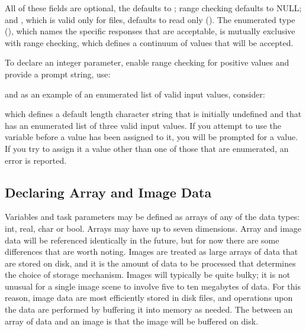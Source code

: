 \noindent
All of these fields are optional, the  defaults to
;  range checking defaults to NULL;
and , which is valid only for files, defaults to
read only ().  The enumerated type (),
which names the specific responses that are acceptable, is
mutually exclusive with range checking, which defines a continuum
of values that will be accepted.

To declare an integer parameter, enable range checking for positive
values and provide a prompt string, use:

\begin{quotation}\noindent
{} 
\end{quotation}

\noindent
and as an example of an
enumerated list of valid input values, consider:

\begin{quotation}\noindent
{} 
\end{quotation}

\noindent
which defines a default length character string that is initially undefined
and that has an enumerated list of three valid input values.
If  you  attempt to use the variable  before a value has 
been assigned to it, you will be prompted for a value.
If you try to assign it a value other than one of those that 
are enumerated, an error is reported.

\subsection{Declaring Array and Image Data}

Variables and task parameters may be defined as arrays of any of the 
data types: int, real, char or bool.  Arrays may have up to seven dimensions.
Array and image data will be referenced identically in the future, 
but for now there
are some differences that are worth noting.  Images are treated
as large arrays of data that are stored on disk, 
and it is the amount of data to be
processed that determines the choice of storage mechanism.  Images
will typically be quite bulky; it is not unusual for a single image
scene to involve five to ten megabytes of data.  For this reason, image data
are most efficiently stored in disk files, and operations upon the
data are performed by buffering it into memory as needed.  The
 between an array of data and an image is that
the image will be buffered on disk.

